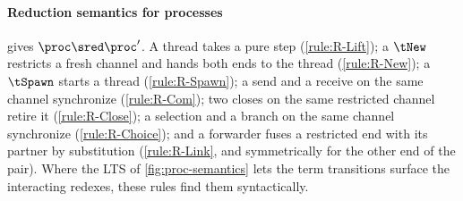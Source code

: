 \paragraph{Reduction semantics for processes}
 gives $\proc \sred \proc'$. A thread takes a
pure step (\ref{rule:R-Lift}); a $\tNew$ restricts a fresh channel and
hands both ends to the thread (\ref{rule:R-New}); a $\tSpawn$ starts a
thread (\ref{rule:R-Spawn}); a send and a receive on the same channel
synchronize (\ref{rule:R-Com}); two closes on the same restricted
channel retire it (\ref{rule:R-Close}); a selection and a branch on
the same channel synchronize (\ref{rule:R-Choice}); and a forwarder fuses a
restricted end with its partner by substitution (\ref{rule:R-Link}, and
symmetrically for the other end of the pair). Where the LTS of
\cref{fig:proc-semantics} lets the term transitions surface the
interacting redexes, these rules find them syntactically.

